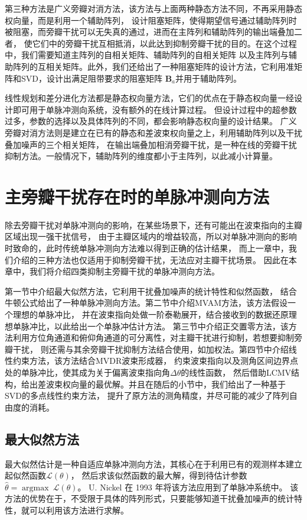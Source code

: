 \documentclass[master]{thesis-uestc}
\begin{document}
第三种方法是广义旁瓣对消方法，该方法与上面两种静态方法不同，不再采用静态权向量，而是利用一个辅助阵列，
设计阻塞矩阵，使得期望信号通过辅助阵列时被阻塞，而旁瓣干扰可以无失真的通过，进而在主阵列和辅助阵列的输出端叠加二者，
使它们中的旁瓣干扰互相抵消，以此达到抑制旁瓣干扰的目的。在这个过程中，我们需要知道主阵列的自相关矩阵、辅助阵列的自相关矩阵
以及主阵列与辅助阵列的互相关矩阵。此外，我们还给出了一种阻塞矩阵的设计方法，它利用准矩阵和SVD，设计出满足阻带要求的阻塞矩阵
$\bm{B}_a$并用于辅助阵列。

线性规划和差分进化方法都是静态权向量方法，它们的优点在于静态权向量一经设计即可用于单脉冲测向系统，没有额外的在线计算过程。
但设计过程中的超参数过多，参数的选择以及具体阵列的不同，都会影响静态权向量的设计结果。
广义旁瓣对消方法则是建立在已有的静态和差波束权向量之上，利用辅助阵列以及干扰叠加噪声的三个相关矩阵，
在输出端叠加相消旁瓣干扰，是一种在线的旁瓣干扰抑制方法。一般情况下，辅助阵列的维度都小于主阵列，以此减小计算量。

\chapter{主旁瓣干扰存在时的单脉冲测向方法}
除去旁瓣干扰对单脉冲测向的影响，在某些场景下，还有可能出在波束指向的主瓣区域出现一强干扰信号，
由于主瓣区域内的增益较高，所以对单脉冲测向的影响时致命的，此时传统单脉冲测向方法难以得到正确的估计结果，
而上一章中，我们介绍的三种方法也仅适用于抑制旁瓣干扰，无法应对主瓣干扰场景。
因此在本章中，我们将介绍四类抑制主旁瓣干扰的单脉冲测向方法。

第一节中介绍最大似然方法，它利用干扰叠加噪声的统计特性和似然函数，
结合牛顿公式给出了一种单脉冲测向方法。第二节中介绍MVAM方法，该方法假设一个理想的单脉冲比，
并在波束指向处做一阶泰勒展开，结合接收到的数据还原理想单脉冲比，以此给出一个单脉冲估计方法。
第三节中介绍正交置零方法，该方法利用方位角通道和俯仰角通道的可分离性，对主瓣干扰进行抑制，若想要抑制旁瓣干扰，
则还需与其余旁瓣干扰抑制方法结合使用，如加权法。第四节中介绍线性约束方法，该方法结合MVDR波束形成器，
约束波束指向以及测角区间边界点处的单脉冲比，使其成为关于偏离波束指向角$\Delta\theta$的线性函数，
然后借助LCMV结构，给出差波束权向量的最优解。并且在随后的小节中，我们给出了一种基于SVD的多点线性约束方法，
提升了原方法的测角精度，并尽可能的减少了阵列自由度的消耗。

\section{最大似然方法}
最大似然估计是一种自适应单脉冲测向方法，其核心在于利用已有的观测样本建立起似然函数$\mathcal{L}(\theta)$，
然后求该似然函数的最大解，得到待估计参数$\hat{\theta}=\operatorname{argmax}~\mathcal{L}(\theta)$。
U. Nickel 在 1993 年将该方法应用到了单脉冲系统中\cite{Nickel_93}。
该方法的优势在于，不受限于具体的阵列形式，只要能够知道干扰叠加噪声的统计特性，就可以利用该方法进行求解。
\end{document}
